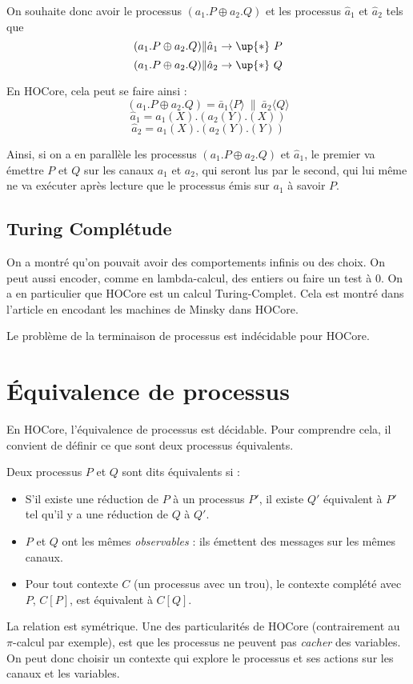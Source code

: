 \documentclass[11pt]{article}
\def\pic{$\pi$-calcul }
\def\+{\oplus}
\begin{document}
On souhaite donc avoir le processus $(a_1.P\+ a_2.Q)$ et les processus $\hat{a}_1$ et $\hat{a}_2$ tels que
$$(a_1.P\+ a_2.Q)\|\hat{a}_1\rightarrow\up{*}\ P$$
$$(a_1.P\+ a_2.Q)\|\hat{a}_2\rightarrow\up{*}\ Q$$

En HOCore, cela peut se faire ainsi :
$$(a_1.P\+ a_2.Q) = \bar{a}_1\langle P\rangle\ \|\ \bar{a}_2\langle Q\rangle$$
$$\hat{a}_1 = a_1(X).(a_2(Y).(X))$$
$$\hat{a}_2 = a_1(X).(a_2(Y).(Y))$$

Ainsi, si on a en parallèle les processus $(a_1.P\+ a_2.Q)$ et  $\hat{a}_1$, le premier va émettre $P$ et $Q$ sur les canaux $a_1$ et $a_2$, qui seront lus par le second, qui lui même ne va exécuter après lecture que le processus émis sur $a_1$ à savoir $P$. 

\subsection{Turing Complétude}
On a montré qu'on pouvait avoir des comportements infinis ou des choix. On peut aussi encoder, comme en lambda-calcul, des entiers ou faire un test à 0. %
On a en particulier que HOCore est un calcul Turing-Complet.
Cela est montré dans l'article \cite{expressiveness} en encodant les machines de Minsky dans HOCore.

Le problème de la terminaison de processus est indécidable pour HOCore.


\section{Équivalence de processus}
En HOCore, l'équivalence de processus est décidable. Pour comprendre cela, il convient de définir ce que sont deux processus équivalents.

Deux processus $P$ et $Q$ sont dits équivalents si :
\begin{itemize}
\item S'il existe une réduction de $P$ à un processus $P'$, il existe $Q'$ équivalent à $P'$ tel qu'il y a une réduction de $Q$ à $Q'$. 
\item $P$ et $Q$ ont les mêmes \textit{observables} : ils émettent des messages sur les mêmes canaux.  
\item Pour tout contexte $C$ (un processus avec un trou), le contexte complété avec $P$, $C[P]$, est équivalent à $C[Q]$.
\end{itemize}
La relation est symétrique. Une des particularités de HOCore (contrairement au \pic par exemple), est que les processus ne peuvent pas \textit{cacher} des variables. On peut donc choisir un contexte qui explore le processus et ses actions sur les canaux et les variables. 
\end{document}
